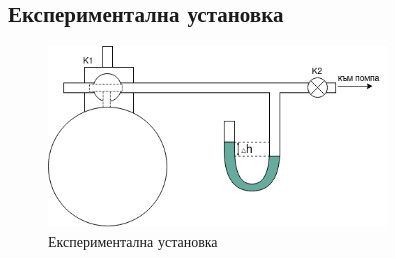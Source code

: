 \documentclass[12pt]{article}
\begin{document}
\subsection{Експериментална установка}\label{sec:Setup}
\begin{figure}
    \centering
    \includegraphics[width=0.8\textwidth]{images/setup.drawio.png}
    \caption{Експериментална установка}
    \label{fig:setup}
\end{figure}
\end{document}

